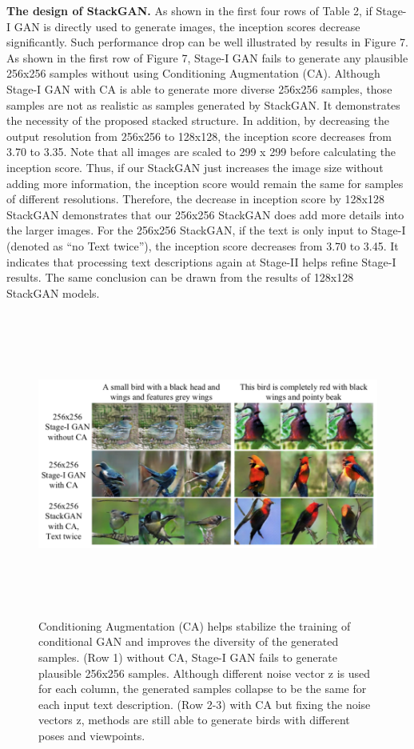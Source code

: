 \documentclass[a4paper,12pt,oneside]{article}
\begin{document}
\textbf{The design of StackGAN. }As shown in the first four rows of Table 2, if Stage-I GAN is directly used to generate images,
the inception scores decrease significantly. Such performance drop can be well illustrated by results in Figure 7. As shown in the first row of Figure 7, Stage-I GAN fails to generate any plausible 
256x256 samples without using Conditioning Augmentation (CA). Although Stage-I GAN with CA is able to generate more diverse 
256x256 samples, those samples are not as realistic as samples generated by StackGAN. It demonstrates the necessity of the proposed stacked structure. 
In addition, by decreasing the output resolution from 256x256 to 128x128, the inception score decreases from 3.70 to 3.35. Note that all images are scaled to 
299 x 299 before calculating the inception score. Thus, if our StackGAN just increases the image size without adding more information, the inception score would remain the same for samples of different resolutions. 
Therefore, the decrease in inception score by 128x128 StackGAN demonstrates that our 256x256 StackGAN does add more details into the larger images. For the 256x256 StackGAN, if the text is only input to Stage-I (denoted as “no 
Text twice”), the inception score decreases from 3.70 to 3.45. It indicates that processing text descriptions again at Stage-II helps refine Stage-I results. The same conclusion can be drawn from the results of 128x128 StackGAN models. 

\begin{figure}[H]
\centering
\includegraphics[height=10cm,width=15cm]{Figure7.png}
\caption[Conditioning Augmentation]{Conditioning Augmentation (CA) helps stabilize the training of conditional GAN and improves the diversity of the generated samples. (Row 1) without CA, Stage-I GAN fails to generate plausible 256x256 samples. Although different noise vector z is used for each column, the generated samples collapse to be the same for each input text description. (Row 2-3) with CA but fixing the noise vectors z, methods are still able to generate birds with different poses and viewpoints.}
\end{figure}
\end{document}
